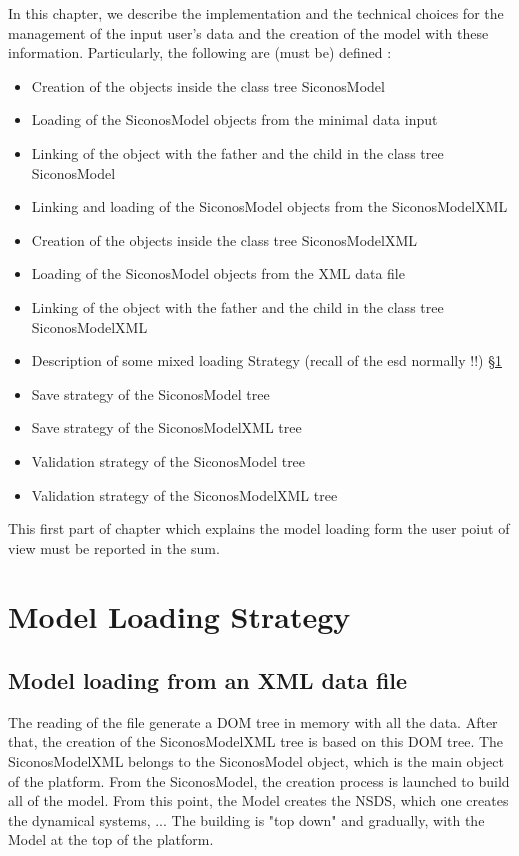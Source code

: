 In this chapter, we describe the implementation and the technical choices for the management of the input user's data and the creation of the model with these information. Particularly, the following are (must be) defined :
\begin{itemize}
\item Creation of the objects inside the class tree SiconosModel
\item Loading of the SiconosModel objects from the minimal data input
\item Linking of the object with the father and the child in the class tree SiconosModel 
\item Linking and loading of the SiconosModel objects from the SiconosModelXML
\item Creation of the objects inside the class tree SiconosModelXML
\item Loading of the SiconosModel objects from the XML data file
\item Linking of the object with the father and the child in the class tree SiconosModelXML
\item Description of some mixed loading Strategy (recall of the \ac{esd} normally !!) \S \ref{Sec:LoadingStrategy}
\item Save strategy of the SiconosModel tree
\item Save strategy of the SiconosModelXML tree
\item Validation strategy of the SiconosModel tree
\item Validation strategy of the SiconosModelXML tree
\end{itemize}


This first  part of chapter which explains  the model loading form the user poiut of view  must be reported in the \ac{sum}. 

\section{Model Loading Strategy}
\label{Sec:LoadingStrategy}


\subsection{Model loading from an  XML data file}

The reading of the file generate a DOM tree in memory with all the data. After that,  the creation of the SiconosModelXML tree is  based on this DOM tree.  The SiconosModelXML belongs to the SiconosModel object, which is the main object of the platform. From the SiconosModel,  the creation process is launched to build  all of the model. From this point, the Model creates the NSDS, which one creates the dynamical systems, ... The building is "top down" and gradually, with the Model at the top of the platform. 





